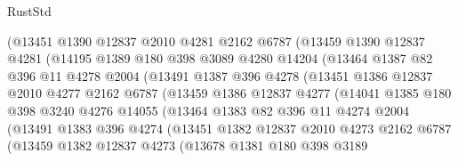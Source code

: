 \begin{lexlean}{RustStd}
\begin{coremodule}
{\begin{coremodule}
{{{{{{{{{{{{{{{{{{{{{{{{{{{{{{{                (@13451
                  @1390
                  @12837
                  @2010
                  @4281
                  @2162
                  @6787
                  (@13459
                    @1390
                    @12837
                    @4281
                    (@14195
                      @1389
                      @180
                      @398
                      @3089
                      @4280
                      @14204
                      (@13464
                        @1387
                        @82
                        @396
                        @11
                        @4278
                        @2004
                        (@13491
                          @1387
                          @396
                          @4278
                          (@13451
                            @1386
                            @12837
                            @2010
                            @4277
                            @2162
                            @6787
                            (@13459
                              @1386
                              @12837
                              @4277
                              (@14041
                                @1385
                                @180
                                @398
                                @3240
                                @4276
                                @14055
                                (@13464
                                  @1383
                                  @82
                                  @396
                                  @11
                                  @4274
                                  @2004
                                  (@13491
                                    @1383
                                    @396
                                    @4274
                                    (@13451
                                      @1382
                                      @12837
                                      @2010
                                      @4273
                                      @2162
                                      @6787
                                      (@13459
                                        @1382
                                        @12837
                                        @4273
                                        (@13678
                                          @1381
                                          @180
                                          @398
                                          @3189
}}}}}}}}}}}}}}}}}}}}}}}}}}}}}}}
\end{coremodule}}
\end{coremodule}
\end{lexlean}
